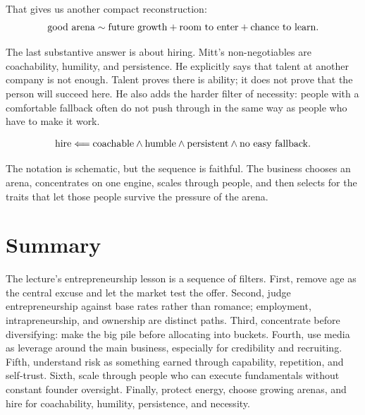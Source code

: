 That gives us another compact reconstruction:
\begin{equation}
  \hbox{good arena}
  \sim
  \hbox{future growth}
  +
  \hbox{room to enter}
  +
  \hbox{chance to learn}.
\end{equation}

The last substantive answer is about hiring. Mitt's non-negotiables are coachability, humility, and persistence. He explicitly says that talent at another company is not enough. Talent proves there is ability; it does not prove that the person will succeed here. He also adds the harder filter of necessity: people with a comfortable fallback often do not push through in the same way as people who have to make it work.

\begin{equation}
  \hbox{hire}
  \Longleftarrow
  \hbox{coachable}
  \wedge
  \hbox{humble}
  \wedge
  \hbox{persistent}
  \wedge
  \hbox{no easy fallback}.
\end{equation}

The notation is schematic, but the sequence is faithful. The business chooses an arena, concentrates on one engine, scales through people, and then selects for the traits that let those people survive the pressure of the arena.

\section{Summary}

The lecture's entrepreneurship lesson is a sequence of filters. First, remove age as the central excuse and let the market test the offer. Second, judge entrepreneurship against base rates rather than romance; employment, intrapreneurship, and ownership are distinct paths. Third, concentrate before diversifying: make the big pile before allocating into buckets. Fourth, use media as leverage around the main business, especially for credibility and recruiting. Fifth, understand risk as something earned through capability, repetition, and self-trust. Sixth, scale through people who can execute fundamentals without constant founder oversight. Finally, protect energy, choose growing arenas, and hire for coachability, humility, persistence, and necessity.